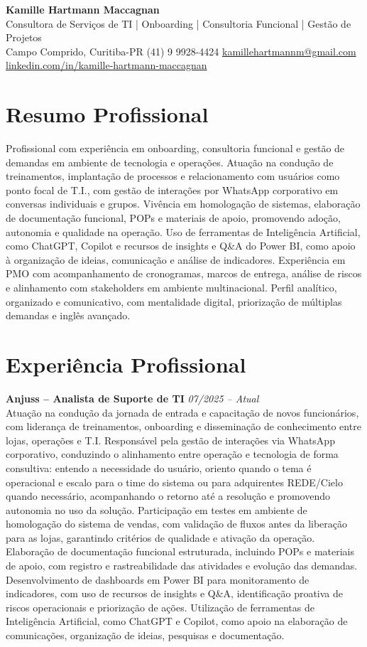 \documentclass[11pt,a4paper]{article}
\newcommand{\cvheader}[4]{%
  \begin{center}
    {\LARGE\bfseries #1}\\[4pt]
    {\large #2}\\[6pt]
    #3\\[2pt]
    #4
  \end{center}
  \vspace{4pt}
}
\newcommand{\experience}[3]{%
  \textbf{#1} \hfill \textit{#2}\\[4pt]
  #3
  \vspace{8pt}
}
\begin{document}
\cvheader{Kamille Hartmann Maccagnan}%
{Consultora de Serviços de TI | Onboarding | Consultoria Funcional | Gestão de Projetos}%
{Campo Comprido, Curitiba-PR \textbullet{} (41) 9 9928-4424 \textbullet{} \href{mailto:kamillehartmannm@gmail.com}{kamillehartmannm@gmail.com}}%
{\href{https://linkedin.com/in/kamille-hartmann-maccagnan/}{linkedin.com/in/kamille-hartmann-maccagnan}}

\section*{Resumo Profissional}

Profissional com experiência em onboarding, consultoria funcional e gestão de demandas em ambiente de tecnologia e operações. Atuação na condução de treinamentos, implantação de processos e relacionamento com usuários como ponto focal de T.I., com gestão de interações por WhatsApp corporativo em conversas individuais e grupos. Vivência em homologação de sistemas, elaboração de documentação funcional, POPs e materiais de apoio, promovendo adoção, autonomia e qualidade na operação. Uso de ferramentas de Inteligência Artificial, como ChatGPT, Copilot e recursos de insights e Q\&A do Power BI, como apoio à organização de ideias, comunicação e análise de indicadores. Experiência em PMO com acompanhamento de cronogramas, marcos de entrega, análise de riscos e alinhamento com stakeholders em ambiente multinacional. Perfil analítico, organizado e comunicativo, com mentalidade digital, priorização de múltiplas demandas e inglês avançado.

\section*{Experiência Profissional}

\experience{Anjuss -- Analista de Suporte de TI}{07/2025 -- Atual}{%
Atuação na condução da jornada de entrada e capacitação de novos funcionários, com liderança de treinamentos, onboarding e disseminação de conhecimento entre lojas, operações e T.I. Responsável pela gestão de interações via WhatsApp corporativo, conduzindo o alinhamento entre operação e tecnologia de forma consultiva: entendo a necessidade do usuário, oriento quando o tema é operacional e escalo para o time do sistema ou para adquirentes REDE/Cielo quando necessário, acompanhando o retorno até a resolução e promovendo autonomia no uso da solução. Participação em testes em ambiente de homologação do sistema de vendas, com validação de fluxos antes da liberação para as lojas, garantindo critérios de qualidade e ativação da operação. Elaboração de documentação funcional estruturada, incluindo POPs e materiais de apoio, com registro e rastreabilidade das atividades e evolução das demandas. Desenvolvimento de dashboards em Power BI para monitoramento de indicadores, com uso de recursos de insights e Q\&A, identificação proativa de riscos operacionais e priorização de ações. Utilização de ferramentas de Inteligência Artificial, como ChatGPT e Copilot, como apoio na elaboração de comunicações, organização de ideias, pesquisas e documentação.}
\end{document}
